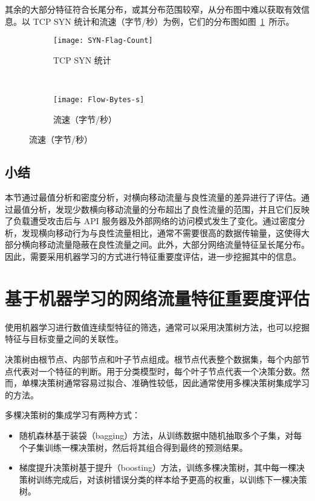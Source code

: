{其余的大部分特征符合长尾分布，或其分布范围较窄，从分布图中难以获取有效信息。以 TCP SYN 统计和流速（字节/秒）为例，它们的分布图如图~\ref{fig:syn-flag-count}~所示。

\begin{figure}[t]
    \centering
    \begin{subfigure}[b]{0.48\textwidth}
      \texttt{[image: SYN-Flag-Count]}
      \caption{TCP SYN 统计}
    \end{subfigure}
    ~
    \begin{subfigure}[b]{0.48\textwidth}
      \texttt{[image: Flow-Bytes-s]}
      \caption{流速（字节/秒）}
    \end{subfigure}
    \label{fig:syn-flag-count}
\end{figure}

\subsection{小结}

本节通过最值分析和密度分析，对横向移动流量与良性流量的差异进行了评估。通过最值分析，发现少数横向移动流量的分布超出了良性流量的范围，并且它们反映了负载遭受攻击后与 API 服务器及外部网络的访问模式发生了变化。通过密度分析，发现横向移动行为与良性流量相比，通常不需要很高的数据传输量，这使得大部分横向移动流量隐蔽在良性流量之间。此外，大部分网络流量特征呈长尾分布。因此，需要采用机器学习的方式进行特征重要度评估，进一步挖掘其中的信息。

\section{基于机器学习的网络流量特征重要度评估}
\label{sec:filter}

使用机器学习进行数值连续型特征的筛选，通常可以采用决策树方法，也可以挖掘特征与目标变量之间的关联性。

决策树由根节点、内部节点和叶子节点组成。根节点代表整个数据集，每个内部节点代表对一个特征的判断。用于分类模型时，每个叶子节点代表一个决策分数。然而，单棵决策树通常容易过拟合、准确性较低，因此通常使用多棵决策树集成学习的方法。

多棵决策树的集成学习有两种方式：

\begin{itemize}
    \item 随机森林基于装袋（bagging）方法，从训练数据中随机抽取多个子集，对每个子集训练一棵决策树，然后将其组合得到最终的预测结果。
    \item 梯度提升决策树基于提升（boosting）方法，训练多棵决策树，其中每一棵决策树训练完成后，对该树错误分类的样本给予更高的权重，以训练下一棵决策树。
\end{itemize}

}

